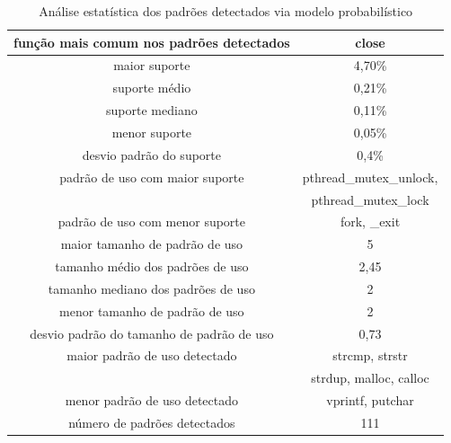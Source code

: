 \begin{table}[H]
\centering
\begin{tabular}{ | c | c |}
  \hline
  função mais comum nos padrões detectados & close \\
  \hline
  maior suporte & 4,70\% \\
  \hline
  suporte médio &  0,21\%\\
  \hline
  suporte mediano & 0,11\% \\
  \hline
  menor suporte & 0,05\% \\
  \hline
  desvio padrão do suporte & 0,4\% \\
  \hline
  padrão de uso com maior suporte & pthread\_mutex\_unlock, \\
   & pthread\_mutex\_lock \\
  \hline
  padrão de uso com menor suporte & fork, \_exit \\
  \hline
  maior tamanho de padrão de uso & 5\\
  \hline
  tamanho médio dos padrões de uso & 2,45 \\
  \hline
  tamanho mediano dos padrões de uso & 2 \\
  \hline
  menor tamanho de padrão de uso & 2\\
  \hline
  desvio padrão do tamanho de padrão de uso & 0,73 \\
  \hline
  maior padrão de uso detectado & strcmp, strstr\\
   & strdup, malloc, calloc\\
  \hline
  menor padrão de uso detectado & vprintf, putchar\\
  \hline
  número de padrões detectados & 111 \\
  \hline
\end{tabular}
\caption{Análise estatística dos padrões detectados via modelo probabilístico}
\label{desc_pam}
\end{table}

